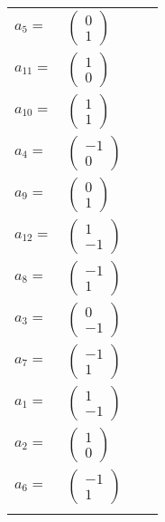 \documentclass[1p]{elsarticle_modified}
\theoremstyle{definition}
\begin{document}
\begin{tabular}{m{7pt} m{180pt} m{7pt} m{180pt} }
\flushright $a_{5}=$&$\begin{pmatrix}0\\1\end{pmatrix}$ \\
\flushright $a_{11}=$&$\begin{pmatrix}1\\0\end{pmatrix}$ \\
\flushright $a_{10}=$&$\begin{pmatrix}1\\1\end{pmatrix}$ \\
\flushright $a_{4}=$&$\begin{pmatrix}-1\\0\end{pmatrix}$ \\
\flushright $a_{9}=$&$\begin{pmatrix}0\\1\end{pmatrix}$ \\
\flushright $a_{12}=$&$\begin{pmatrix}1\\-1\end{pmatrix}$ \\
\flushright $a_{8}=$&$\begin{pmatrix}-1\\1\end{pmatrix}$ \\
\flushright $a_{3}=$&$\begin{pmatrix}0\\-1\end{pmatrix}$ \\
\flushright $a_{7}=$&$\begin{pmatrix}-1\\1\end{pmatrix}$ \\
\flushright $a_{1}=$&$\begin{pmatrix}1\\-1\end{pmatrix}$ \\
\flushright $a_{2}=$&$\begin{pmatrix}1\\0\end{pmatrix}$ \\
\flushright $a_{6}=$&$\begin{pmatrix}-1\\1\end{pmatrix}$\\&\end{tabular}
\end{document}
